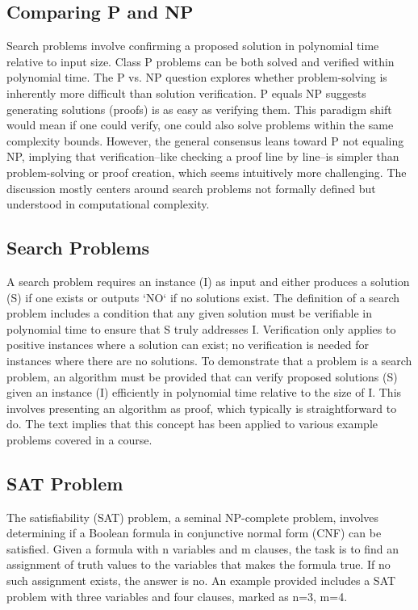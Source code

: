 \subsection*{Comparing P and NP}
Search problems involve confirming a proposed solution in polynomial time relative to input size.
Class P problems can be both solved and verified within polynomial time.
The P vs.
NP question explores whether problem-solving is inherently more difficult than solution verification.
P equals NP suggests generating solutions (proofs) is as easy as verifying them.
This paradigm shift would mean if one could verify, one could also solve problems within the same complexity bounds.
However, the general consensus leans toward P not equaling NP, implying that verification--like checking a proof line by line--is simpler than problem-solving or proof creation, which seems intuitively more challenging.
The discussion mostly centers around search problems not formally defined but understood in computational complexity.

\subsection*{Search Problems}
A search problem requires an instance (I) as input and either produces a solution (S) if one exists or outputs `NO` if no solutions exist.
The definition of a search problem includes a condition that any given solution must be verifiable in polynomial time to ensure that S truly addresses I\@.
Verification only applies to positive instances where a solution can exist; no verification is needed for instances where there are no solutions.
To demonstrate that a problem is a search problem, an algorithm must be provided that can verify proposed solutions (S) given an instance (I) efficiently in polynomial time relative to the size of I\@.
This involves presenting an algorithm as proof, which typically is straightforward to do.
The text implies that this concept has been applied to various example problems covered in a course.

\subsection*{SAT Problem}
The satisfiability (SAT) problem, a seminal NP-complete problem, involves determining if a Boolean formula in conjunctive normal form (CNF) can be satisfied.
Given a formula with n variables and m clauses, the task is to find an assignment of truth values to the variables that makes the formula true.
If no such assignment exists, the answer is no.
An example provided includes a SAT problem with three variables and four clauses, marked as n=3, m=4.

